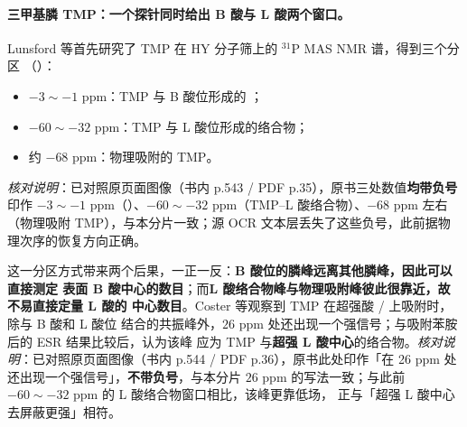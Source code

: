 \paragraph{三甲基膦 TMP：一个探针同时给出 B 酸与 L 酸两个窗口。}
Lunsford 等首先研究了 TMP 在 HY 分子筛上的 $^{31}$P MAS NMR 谱，得到三个分区
（）：

\begin{itemize}[leftmargin=1.6em,itemsep=1pt,topsep=2pt]
\item $-3\sim-1$ ppm：TMP 与 B 酸位形成的 ；
\item $-60\sim-32$ ppm：TMP 与 L 酸位形成的络合物；
\item 约 $-68$ ppm：物理吸附的 TMP。
\end{itemize}

\emph{核对说明}：已对照原页面图像（书内 p.543 / PDF p.35），原书三处数值\textbf{均带负号}
印作 $-3\sim-1$ ppm（）、$-60\sim-32$ ppm（TMP–L 酸络合物）、$-68$ ppm 左右
（物理吸附 TMP），与本分片一致；源 OCR 文本层丢失了这些负号，此前据物理次序的恢复方向正确。

这一分区方式带来两个后果，一正一反：\textbf{B 酸位的膦峰远离其他膦峰，因此可以直接测定
表面 B 酸中心的数目}；而\textbf{L 酸络合物峰与物理吸附峰彼此很靠近，故不易直接定量 L 酸的
中心数目}。Coster 等观察到 TMP 在超强酸 / 上吸附时，除与 B 酸和 L 酸位
结合的共振峰外，$26$ ppm 处还出现一个强信号；与吸附苯胺后的 ESR 结果比较后，认为该峰
应为 TMP 与\textbf{超强 L 酸中心}的络合物。\emph{核对说明}：已对照原页面图像（书内 p.544 /
PDF p.36），原书此处印作「在 26 ppm 处还出现一个强信号」，\textbf{不带负号}，与本分片
$26$ ppm 的写法一致；与此前 $-60\sim-32$ ppm 的 L 酸络合物窗口相比，该峰更靠低场，
正与「超强 L 酸中心去屏蔽更强」相符。

